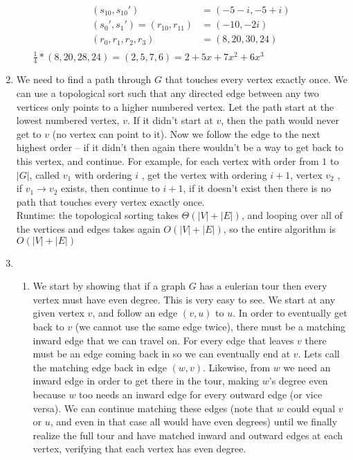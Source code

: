 \documentclass[11pt]{article}
\begin{document}
\begin{enumerate}
\begin{enumerate}
\begin{align*}
(s_{10},s_{10}')&=(-5-i,-5+i)\\
(s_0',s_1')=(r_{10},r_{11})&=(-10,-2i)\\
(r_0,r_1,r_2,r_3)&=(8,20,30,24)\\
\end{align*}
$\frac{1}{4}*(8,20,28,24)=(2,5,7,6)=2+5x+7x^2+6x^3$
\end{enumerate}
\newpage
\item
We need to find a path through $G$ that touches every vertex exactly once. We can use a topological sort such that any directed edge between any two vertices only points to a higher numbered vertex. Let the path start at the lowest numbered vertex, $v$. If it didn't start at $v$, then the path would never get to $v$ (no vertex can point to it). Now we follow the edge to the next highest order -- if it didn't then again there wouldn't be a way to get back to this vertex, and continue. For example, for each vertex with order from $1$ to $|G|$, called $v_1$ with ordering $i$ , get the vertex with ordering $i+1$, vertex $v_2$ , if $v_1\to v_2$ exists, then continue to $i+1$, if it doesn't exist then there is no path that touches every vertex exactly once.\\
Runtime: the topological sorting takes $\Theta(|V|+|E|)$, and looping over all of the vertices and edges takes again $O(|V|+|E|)$, so the entire algorithm is $O(|V|+|E|)$
\newpage
\item
\begin{enumerate}
\item We start by showing that if a graph $G$ has a eulerian tour then every vertex must have even degree. This is very easy to see. We start at any given vertex $v$, and follow an edge $(v,u)$ to $u$. In order to eventually get back to $v$ (we cannot use the same edge twice), there must be a matching inward edge that we can travel on. For every edge that leaves $v$ there must be an edge coming back in so we can eventually end at $v$. Lets call the matching edge back in edge $(w,v)$. Likewise, from $w$ we need an inward edge in order to get there in the tour, making $w$'s degree even because $w$ too needs an inward edge for every outward edge (or vice versa). We can continue matching these edges (note that $w$ could equal $v$ or $u$, and even in that case all would have even degrees) until we finally realize the full tour and have matched inward and outward edges at each vertex, verifying that each vertex has even degree.\\

\end{enumerate}
\end{enumerate}
\end{document}
